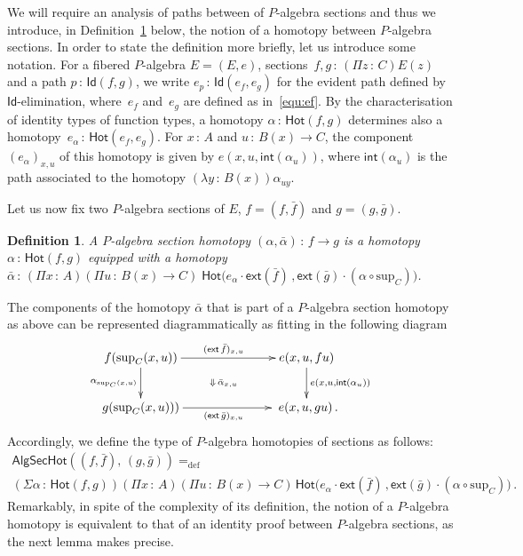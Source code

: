 \documentclass[10pt,a4paper,oneside,reqno]{amsart}
\numberwithin{equation}{section}
\theoremstyle{mythm}
\theoremstyle{mydef}
\newtheorem{definition}[theorem]{Definition}
\theoremstyle{myrmk}
\newcommand{\defeq}{=_{\mathrm{def}}}
\newcommand{\co}{\,{:}\,}
\newcommand{\ct}{\cdot}
\newcommand{\Hot}{\mathsf{Hot}}
\newcommand{\ext}{\mathsf{ext}}
\renewcommand{\int}{\mathsf{int}}
\newcommand{\Id}{\mathsf{Id}}
\renewcommand{\sup}{\mathrm{sup}}
\newcommand{\AlgSecHot}{\mathsf{AlgSecHot}}
\begin{document}
\medskip


We will require an analysis of paths between of $P$-algebra sections and thus we introduce, in Definition~\ref{def:W2cellsection} below, the
notion of a homotopy between $P$-algebra sections. In order to state the definition more briefly, let us introduce some
notation. For a fibered $P$-algebra $E = (E,e)$, sections~$f, g \co (\Pi z \co C) E(z)$ and a path $p \co
\Id(f,g)$, we write $e_p \co \Id(e_f, e_g)$ for the evident path defined by $\Id$-elimination, 
where~$e_f$ and~$e_g$ are defined as in~\eqref{equ:ef}. By the characterisation of identity types of
function types,  a homotopy $\alpha \co \Hot(f,g)$ determines also 
a homotopy~$e_\alpha \co \Hot(e_f, e_g)$. For $x \co A$ and $u \co B(x) \to C$, the 
component $(e_\alpha)_{x,u}$ of this homotopy is given by $e(x, u, \int(\alpha_u))$, where
$\int(\alpha_u)$ is the path associated to the homotopy $(\lambda y \co B(x)) \alpha_{uy}$.

\medskip

Let us now fix two $P$-algebra sections  of $E$,  $f = (f, \bar{f})$ and $g = (g, \bar{g})$. 

\begin{definition} \label{def:W2cellsection}  A \emph{$P$-algebra section homotopy} 
$(\alpha , \bar{\alpha}) \co f  \rightarrow g$  
is a homotopy~$\alpha \co \Hot(f, g)$ equipped with a homotopy
$\bar{\alpha} \co 
(\Pi x \co A) (\Pi u \co B(x) \to C) \;
\Hot\big(  e_\alpha \ct \ext( \bar{f}) \, , 
 \ext( \bar{g}) \ct (\alpha \circ \sup_C)   \big)$.
\end{definition} 

The components of the homotopy $\bar{\alpha}$ that is part of a $P$-algebra section homotopy as above  can be
represented diagrammatically as fitting in the following diagram
\[
\xymatrix@C=2.5cm{
f ( \sup_C(x,u)) \ar[d]_{\alpha_{\sup_C(x,u)}} \ar[r]^{(\ext \, \bar{f})_{x,u}}  
\ar@{}[dr]|{\Downarrow \, \bar{\alpha}_{x,u}}  & e(x,u, fu)  \ar[d]^{e(x,u, \int(\alpha_u))} \\ 
g(\sup_C(x,u)) ) \ar[r]_{(\ext \, \bar{g})_{x,u}} & \;  e(x, u, gu) \, .}
\]
Accordingly, we define the type of $P$-algebra homotopies of sections as follows:
\begin{multline*} 
\AlgSecHot( (f, \bar{f}) ,\, (g, \bar{g}) )  \defeq  \\ 
(\Sigma \alpha \co \Hot( f , g)) 
(\Pi x \co A) 
(\Pi u \co B(x) \to C) \, 
\Hot\big(  e_\alpha \ct \ext( \bar{f}) \, , 
 \ext( \bar{g}) \ct (\alpha \circ \sup_C)   \big) \, .
\end{multline*}
Remarkably, in spite of the complexity of its definition, the notion of a $P$-algebra homotopy is equivalent to
that of an identity proof between $P$-algebra sections, as the next lemma makes precise.
\end{document}

